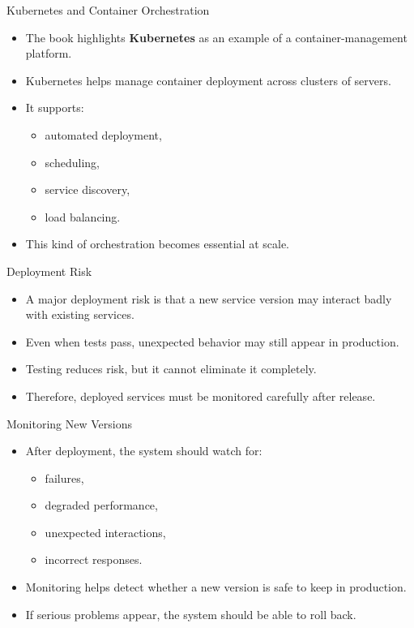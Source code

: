 \begin{frame}{Kubernetes and Container Orchestration}
\begin{itemize}
    \item The book highlights \textbf{Kubernetes} as an example of a container-management platform.
    \item Kubernetes helps manage container deployment across clusters of servers.
    \item It supports:
    \begin{itemize}
        \item automated deployment,
        \item scheduling,
        \item service discovery,
        \item load balancing.
    \end{itemize}
    \item This kind of orchestration becomes essential at scale.
\end{itemize}
\end{frame}

\begin{frame}{Deployment Risk}
\begin{itemize}
    \item A major deployment risk is that a new service version may interact badly with existing services.
    \item Even when tests pass, unexpected behavior may still appear in production.
    \item Testing reduces risk, but it cannot eliminate it completely.
    \item Therefore, deployed services must be monitored carefully after release.
\end{itemize}
\end{frame}

\begin{frame}{Monitoring New Versions}
\begin{itemize}
    \item After deployment, the system should watch for:
    \begin{itemize}
        \item failures,
        \item degraded performance,
        \item unexpected interactions,
        \item incorrect responses.
    \end{itemize}
    \item Monitoring helps detect whether a new version is safe to keep in production.
    \item If serious problems appear, the system should be able to roll back.
\end{itemize}
\end{frame}


